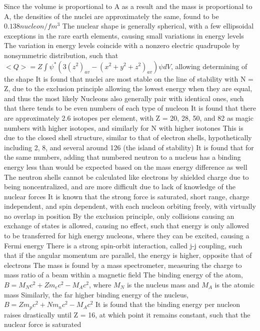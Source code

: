 \documentclass[11 pt, twoside]{article}
\newenvironment{outline*}
{
	\begin{outline}[enumerate]
	}
	{\end{outline}
}
\begin{document}
\begin{outline*}
		\3 Since the volume is proportional to A as a result and the mass is proportional to A, the densities of the nuclei are approximately the same, found to be $0.138 nucleon/fm^3$
\1 The nuclear shape is generally spherical, with a few ellipsoidal exceptions in the rare earth elements, causing small variations in energy levels
	\2 The variation in energy levels coincide with a nonzero electric quadrupole by nonsymmetric distribution, such that $<Q> = Z\int \psi^* (3(z^2)_{av} - (x^2 + y^2 + z^2)_{av})\psi dV$, allowing determining of the shape
\1 It is found that nuclei are most stable on the line of stability with N = Z, due to the exclusion principle allowing the lowest energy when they are equal, and thus the most likely
	\2 Nucleons also generally pair with identical ones, such that there tends to be even numbers of each type of nucleon
	\2 It is found that there are approximately 2.6 isotopes per element, with Z = 20, 28, 50, and 82 as magic numbers with higher isotopes, and similarly for N with higher isotones
		\3 This is due to the closed shell structure, similar to that of electron shells, hypothetically including 2, 8, and several around 126 (the island of stability)
		\3 It is found that for the same numbers, adding that numbered neutron to a nucleus has a binding energy less than would be expected based on the mass energy difference as well
		\3 The neutron shells cannot be calculated like electrons by shielded charge due to being noncentralized, and are more difficult due to lack of knowledge of the nuclear forces
			\4 It is known that the strong force is saturated, short range, charge independent, and spin dependent, with each nucleon orbiting freely, with virtually no overlap in position
			\4 By the exclusion principle, only collisions causing an exchange of states is allowed, causing no effect, such that energy is only allowed to be transferred for high energy nucleons, where they can be excited, causing a Fermi energy
			\4 There is a strong spin-orbit interaction, called j-j coupling, such that if the angular momentum are parallel, the energy is higher, opposite that of electrons 
	\2 The mass is found by a mass spectrometer, measuring the charge to mass ratio of a beam within a magnetic field
\1 The binding energy of the atom, $B = M_Nc^2 + Zm_ec^2 - M_Ac^2$, where $M_N$ is the nucleus mass and $M_A$ is the atomic mass
	\2 Similarly, the far higher binding energy of the nucleus, $B = Zm_pc^2 + Nm_nc^2 - M_Ac^2$
	\2 It is found that the binding energy per nucleon raises drastically until Z = 16, at which point it remains constant, such that the nuclear force is saturated

\end{outline*}
\end{document}
